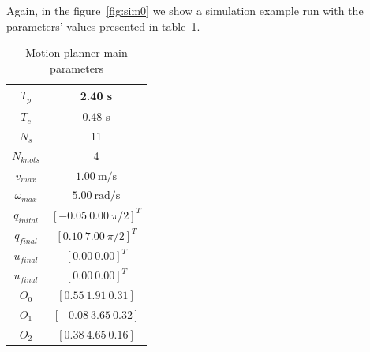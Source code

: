 Again, in the figure~\ref{fig:sim0} we show a simulation example run with the parameters' values presented in table~\ref{tab:s3param}.

\begin{table}[!h]
\caption {Motion planner main parameters} \label{tab:s3param}
\begin{center}
\begin{tabular}{|c|c|}
\hline
$T_p$ & 2.40 s\\
\hline 
$T_c$ & 0.48 s\\
\hline 
$N_s$ & 11\\
\hline 
$N_{knots}$ & 4\\
\hline
$v_{max}$ & $1.00\ \mathrm{m/s}$\\
\hline
$\omega_{max}$ & $5.00\ \mathrm{rad/s}$\\
\hline
$q_{inital}$ & $[-0.05\ 0.00\ \pi/2]^T$\\
\hline
$q_{final}$ & $[0.10\ 7.00\ \pi/2]^T$\\
\hline
$u_{final}$ & $[0.00\ 0.00]^T$\\
\hline
$u_{final}$ & $[0.00\ 0.00]^T$\\
\hline
$O_0$ & $[0.55\ 1.91\ 0.31]$\\
\hline
$O_1$ & $[-0.08\ 3.65\ 0.32]$\\
\hline
$O_2$ & $[0.38\ 4.65\ 0.16]$\\
\hline
\end{tabular}
\end{center}
\end{table}

